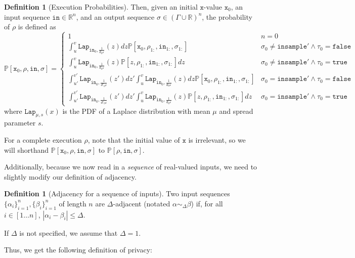 \documentclass[12pt]{article}
\newcommand{\RR}{\mathbb{R}}
\newcommand{\PP}{\mathbb{P}}
\newcommand{\Lap}{\texttt{Lap}}
\theoremstyle{definition}
\newtheorem{defn}[thm]{Definition}
\begin{document}
\begin{defn}[Execution Probabilities]
    Then, given an initial $\texttt{x}$-value $\texttt{x}_0$, an input sequence $\texttt{in}\in \RR^n$, and an output sequence $\sigma\in (\Gamma\cup\RR)^n$, the probability of $\rho$ is defined as \[
        \PP[\texttt{x}_0, \rho, \texttt{in}, \sigma] = \begin{cases}
            1 & n = 0\\
            \int_u^v \Lap_{\texttt{in}_0, \frac{1}{d_0\varepsilon}}(z)dz\PP[\texttt{x}_0, \rho_{1:}, \texttt{in}_{1:}, \sigma_{1:}] & \sigma_0 \neq \texttt{insample}' \land \tau_0 = \texttt{false}\\
            \int_u^v \Lap_{\texttt{in}_0, \frac{1}{d_0\varepsilon}}(z)\PP[z, \rho_{1:}, \texttt{in}_{1:}, \sigma_{1:}]dz  & \sigma_0 \neq \texttt{insample}'\land \tau_0=\texttt{true} \\
            \int_{u'}^{v'}\Lap_{\texttt{in}_0, \frac{1}{d'_0\varepsilon}}(z')dz'\int_u^v \Lap_{\texttt{in}_0, \frac{1}{d_0\varepsilon}}(z)dz\PP[\texttt{x}_0, \rho_{1:}, \texttt{in}_{1:}, \sigma_{1:}]& \sigma_0 = \texttt{insample}'\land \tau_0 = \texttt{false}\\
            \int_{u'}^{v'}\Lap_{\texttt{in}_0, \frac{1}{d'_0\varepsilon}}(z')dz'\int_u^v \Lap_{\texttt{in}_0, \frac{1}{d_0\varepsilon}}(z)\PP[z, \rho_{1:}, \texttt{in}_{1:}, \sigma_{1:}]dz& \sigma_0 = \texttt{insample}'\land \tau_0 = \texttt{true}
        \end{cases}
    \]
    where $\Lap_{\mu, s}(x)$ is the PDF of a Laplace distribution with mean $\mu$ and spread parameter $s$.
\end{defn}

For a complete execution $\rho$, note that the initial value of $\texttt{x}$ is irrelevant, so we will shorthand $\PP[\texttt{x}_0, \rho, \texttt{in}, \sigma]$ to $\PP[\rho, \texttt{in}, \sigma]$.

Additionally, because we now read in a \textit{sequence} of real-valued inputs, we need to slightly modify our definition of adjacency.

\begin{defn}[Adjacency for a sequence of inputs]
    Two input sequences $\{\alpha_i\}_{i=1}^n, \{\beta_i\}_{i=1}^n$ of length $n$ are $\Delta$-adjacent (notated $\alpha \sim_{\Delta}\beta$) if, for all $i\in [1\ldots n]$, $|\alpha_i-\beta_i|\leq \Delta$. 

    If $\Delta$ is not specified, we assume that $\Delta = 1$. 
\end{defn}

Thus, we get the following definition of privacy:
\end{document}
